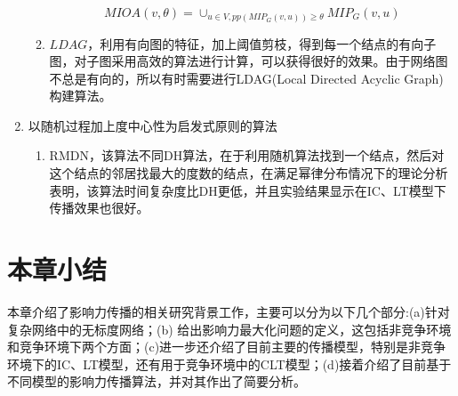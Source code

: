 \begin{enumerate}
\begin{enumerate}
\begin{displaymath}
\end{displaymath}
\begin{displaymath}
MIOA(v, \theta)=\cup_{u \in V,pp(MIP_{G}(v, u)) \geq \theta}MIP_{G}(v,u)
\end{displaymath}
\item $LDAG$\cite{chen2010scalableICDM}，利用有向图的特征，加上阈值剪枝，得到每一个结点的有向子图，对子图采用高效的算法进行计算，可以获得很好的效果。由于网络图不总是有向的，所以有时需要进行LDAG(Local Directed Acyclic Graph)构建算法。
\end{enumerate}
\item 以随机过程加上度中心性为启发式原则的算法
\begin{enumerate}
\item RMDN\cite{hu2015rmdn}，该算法不同DH算法，在于利用随机算法找到一个结点，然后对这个结点的邻居找最大的度数的结点，在满足幂律分布情况下的理论分析表明，该算法时间复杂度比DH更低，并且实验结果显示在IC、LT模型下传播效果也很好。
\end{enumerate}
\end{enumerate}


\section{本章小结}
本章介绍了影响力传播的相关研究背景工作，主要可以分为以下几个部分:(a)针对复杂网络中的无标度网络；(b) 给出影响力最大化问题的定义，这包括非竞争环境和竞争环境下两个方面；(c)进一步还介绍了目前主要的传播模型，特别是非竞争环境下的IC、LT模型，还有用于竞争环境中的CLT模型；(d)接着介绍了目前基于不同模型的影响力传播算法，并对其作出了简要分析。